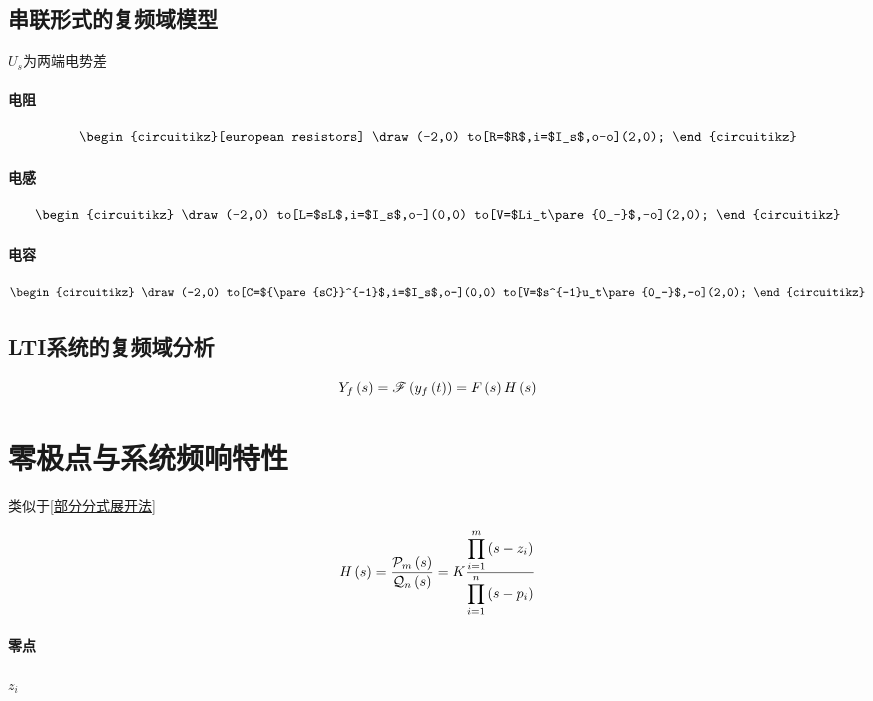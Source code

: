 \documentclass{article}
\begin{document}
\subsection{串联形式的复频域模型}

$U_s$为两端电势差

\paragraph{电阻}

\[\begin{circuitikz}[european resistors]
        \draw(-2,0)
        to[R=$R$,i=$I_s$,o-o](2,0);
    \end{circuitikz}\]

\paragraph{电感}

\[\begin{circuitikz}
        \draw(-2,0)
        to[L=$sL$,i=$I_s$,o-](0,0)
        to[V=$Li_t\pare{0_-}$,-o](2,0);
    \end{circuitikz}\]

\paragraph{电容}

\[\begin{circuitikz}
        \draw(-2,0)
        to[C=${\pare{sC}}^{-1}$,i=$I_s$,o-](0,0)
        to[V=$s^{-1}u_t\pare{0_-}$,-o](2,0);
    \end{circuitikz}\]

\subsection{LTI系统的复频域分析}

\[Y_f\left(s\right)=\mathscr F\left(y_f\left(t\right)\right)=F\left(s\right) H\left(s\right)\]

\section{零极点与系统频响特性}

类似于\ref{部分分式展开法}

\[H\left(s\right)=\frac{\mathcal P_m\left(s\right)}{\mathcal Q_n\left(s\right)}
    =K\frac{\displaystyle\prod_{i=1}^m\left(s-z_i\right)}
    {\displaystyle\prod_{i=1}^n\left(s-p_i\right)}\]

\paragraph{零点}$z_i$
\end{document}

